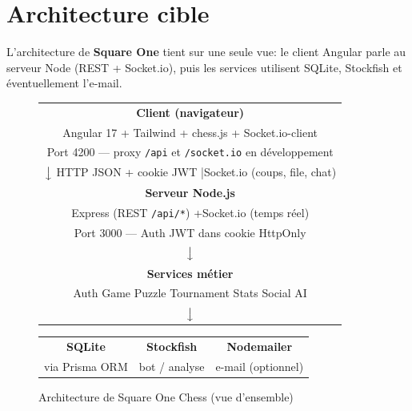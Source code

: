 \documentclass[12pt,a4paper,oneside]{article}
\begin{document}
\clearpage
\section{Architecture cible}

\noindent L'architecture de \textbf{Square One} tient sur une seule vue: le client Angular parle au serveur Node (REST + Socket.io), puis les services utilisent SQLite, Stockfish et éventuellement l'e-mail.

\begin{figure}[H]
\centering
\renewcommand{\arraystretch}{1.35}
\begin{tabular}{|c|}
\hline
\rowcolor{sectionblue!12}
\textbf{Client (navigateur)} \\
Angular 17 + Tailwind + chess.js + Socket.io-client \\
{\footnotesize Port 4200 --- proxy \texttt{/api} et \texttt{/socket.io} en développement} \\
\hline
\multicolumn{1}{c}{$\big\downarrow$ \footnotesize HTTP JSON + cookie JWT \quad|\quad Socket.io (coups, file, chat)} \\
\hline
\rowcolor{sectionblue!12}
\textbf{Serveur Node.js} \\
Express (REST \texttt{/api/*}) \quad+\quad Socket.io (temps réel) \\
{\footnotesize Port 3000 --- Auth JWT dans cookie HttpOnly} \\
\hline
\multicolumn{1}{c}{$\big\downarrow$} \\
\hline
\rowcolor{sectionblue!12}
\textbf{Services métier} \\
Auth \quad Game \quad Puzzle \quad Tournament \quad Stats \quad Social \quad AI \\
\hline
\multicolumn{1}{c}{$\big\downarrow$} \\
\end{tabular}

\vspace{0.4em}
\begin{tabular}{|c|c|c|}
\hline
\rowcolor{sectionblue!8}
\textbf{SQLite} & \textbf{Stockfish} & \textbf{Nodemailer} \\
via Prisma ORM & bot / analyse & e-mail (optionnel) \\
\hline
\end{tabular}
\caption{Architecture de Square One Chess (vue d'ensemble)}
\label{fig:arch-cahier}
\end{figure}
\end{document}
